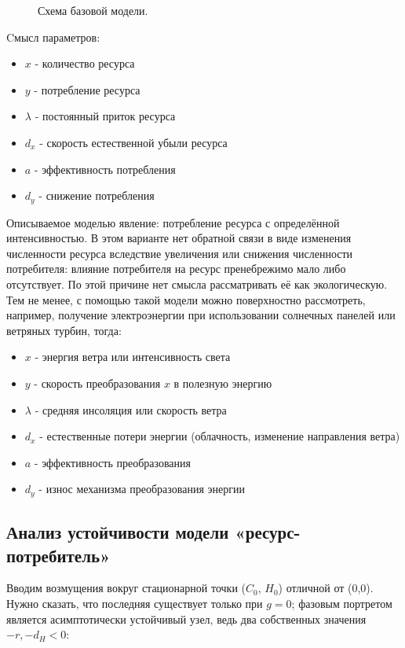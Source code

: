\documentclass[a4paper, 14pt]{extarticle}
\begin{document}
\begin{figure}[H]
\centering

\caption{Схема базовой модели.}
\end{figure}

Cмысл параметров:

\begin{itemize}
    \item $x$ - количество ресурса
    \item $y$ - потребление ресурса  
    \item $\lambda$ - постоянный приток ресурса
    \item $d_x$ - скорость естественной убыли ресурса
    \item $a$ - эффективность потребления
    \item $d_y$ - снижение потребления
\end{itemize}

Описываемое моделью явление: потребление ресурса с определённой интенсивностью. В этом варианте нет обратной связи в виде изменения численности ресурса вследствие увеличения или снижения численности потребителя: влияние потребителя на ресурс пренебрежимо мало либо отсутствует. По этой причине нет смысла рассматривать её как экологическую. Тем не менее, с помощью такой модели можно поверхностно рассмотреть, например, получение электроэнергии при использовании солнечных панелей или ветряных турбин, тогда:

\begin{itemize}
    \item $x$ - энергия ветра или интенсивность света
    \item $y$ - скорость преобразования $x$ в полезную энергию
    \item $\lambda$ - средняя инсоляция или скорость ветра
    \item $d_x$ - естественные потери энергии (облачность, изменение направления ветра)
    \item $a$ - эффективность преобразования
    \item $d_y$ - износ механизма преобразования энергии
\end{itemize}

\newpage

\subsection{Анализ устойчивости модели «ресурс-потребитель»}

Вводим возмущения вокруг стационарной точки ($C_0$, $H_0$) отличной от (0,0). Нужно сказать, что последняя существует только при $g = 0$; фазовым портретом является асимптотически устойчивый узел, ведь два собственных значения $-r, -d_H < 0$:
\end{document}

